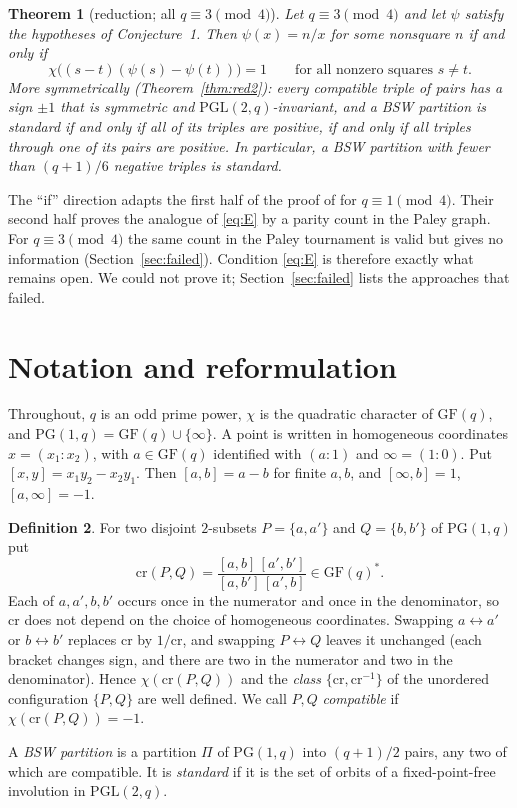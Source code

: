 \documentclass[11pt,a4paper]{article}
\newtheorem{theorem}{Theorem}
\theoremstyle{definition}
\newtheorem{definition}[theorem]{Definition}
\theoremstyle{remark}
\newcommand{\GF}{\mathrm{GF}}
\newcommand{\PG}{\mathrm{PG}}
\newcommand{\PGL}{\mathrm{PGL}}
\newcommand{\cro}{\mathrm{cr}}
\begin{document}
\begin{theorem}[reduction; all $q\equiv3\pmod4$]\label{thm:red}
Let $q\equiv 3\pmod 4$ and let $\psi$ satisfy the hypotheses of Conjecture~1. Then $\psi(x)=n/x$ for some
nonsquare $n$ if and only if
\begin{equation}\label{eq:E}
\chi\bigl((s-t)(\psi(s)-\psi(t))\bigr)=1\qquad\text{for all nonzero squares } s\neq t .
\end{equation}
More symmetrically (Theorem~\ref{thm:red2}): every compatible triple of pairs has a sign $\pm1$ that is symmetric
and $\PGL(2,q)$-invariant, and a BSW partition is standard if and only if all of its triples are positive, if
and only if all triples through one of its pairs are positive. In particular, a BSW partition with fewer than
$(q+1)/6$ negative triples is standard.
\end{theorem}

The ``if'' direction adapts the first half of the proof of \cite{BSW} for $q\equiv1\pmod 4$. Their second half
proves the analogue of \eqref{eq:E} by a parity count in the Paley graph. For $q\equiv3\pmod4$ the same count
in the Paley tournament is valid but gives no information (Section~\ref{sec:failed}). Condition \eqref{eq:E} is
therefore exactly what remains open. We could not prove it; Section~\ref{sec:failed} lists the approaches that
failed.

\section{Notation and reformulation}

Throughout, $q$ is an odd prime power, $\chi$ is the quadratic character of $\GF(q)$, and
$\PG(1,q)=\GF(q)\cup\{\infty\}$. A point is written in homogeneous coordinates $x=(x_1:x_2)$, with
$a\in\GF(q)$ identified with $(a:1)$ and $\infty=(1:0)$. Put $[x,y]=x_1y_2-x_2y_1$. Then $[a,b]=a-b$ for finite
$a,b$, and $[\infty,b]=1$, $[a,\infty]=-1$.

\begin{definition}
For two disjoint $2$-subsets $P=\{a,a'\}$ and $Q=\{b,b'\}$ of $\PG(1,q)$ put
\[
  \cro(P,Q)=\frac{[a,b]\,[a',b']}{[a,b']\,[a',b]}\in\GF(q)^* .
\]
Each of $a,a',b,b'$ occurs once in the numerator and once in the denominator, so $\cro$ does not depend on the
choice of homogeneous coordinates. Swapping $a\leftrightarrow a'$ or $b\leftrightarrow b'$ replaces $\cro$ by
$1/\cro$, and swapping $P\leftrightarrow Q$ leaves it unchanged (each bracket changes sign, and there are two
in the numerator and two in the denominator). Hence $\chi(\cro(P,Q))$ and the \emph{class}
$\{\cro,\cro^{-1}\}$ of the unordered configuration $\{P,Q\}$ are well defined. We call $P,Q$
\emph{compatible} if $\chi(\cro(P,Q))=-1$.

A \emph{BSW partition} is a partition $\Pi$ of $\PG(1,q)$ into $(q+1)/2$ pairs, any two of which are
compatible. It is \emph{standard} if it is the set of orbits of a fixed-point-free involution in $\PGL(2,q)$.
\end{definition}
\end{document}
